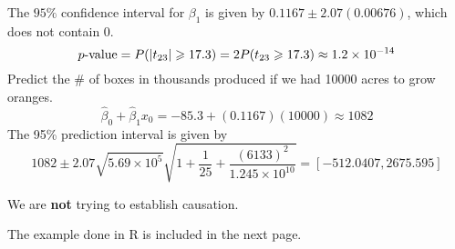\begin{example}
    The $ 95\% $ confidence interval for $ \beta_1 $ is given by
    $ 0.1167\pm 2.07(0.00676) $,
    which does not contain $ 0 $.
    \[ p\text{-value}=P(\lvert t_{23}\rvert\geqslant 17.3)=
        2P(t_{23}\geqslant 17.3)\approx 1.2\times 10^{-14} \]
    Predict the \# of boxes in thousands produced if we had
    10000 acres to grow oranges.
    \[ \hat{\beta}_0+\hat{\beta}_1x_0=-85.3+(0.1167)(10000)\approx 1082 \]
    The 95\% prediction interval is given by
    \[ 1082\pm 2.07\sqrt{5.69\times 10^5}\sqrt{1+\frac{1}{25}+
        \frac{(6133)^2}{1.245\times 10^{10}} }=
            [-512.0407, 2675.595] \]
    \begin{remark}
        We are \textbf{not} trying to establish causation.
    \end{remark}
\end{example}
The example done in R is included in the next page.

